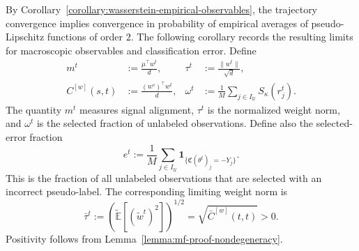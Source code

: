 By Corollary~\ref{corollary:wasserstein-empirical-observables},
the trajectory convergence implies convergence in probability
of empirical averages of pseudo-Lipschitz functions of order $2$.
The following corollary records the resulting limits for
macroscopic observables and classification error.
Define
\begin{align}
    m^t
    &:=
    \frac{\mu^\top w^t}{d},
    &
    \tau^t
    &:=
    \frac{\|w^t\|}{\sqrt d},
    \\
    C^{[w]}(s,t)
    &:=
    \frac{(w^s)^\top w^t}{d},
    &
    \omega^t
    &:=
    \frac1M\sum_{j\in I_{\mathcal U}}S_\kappa(r_j^t).
    \label{eq:finite-dimensional-trajectory-observables}
\end{align}
The quantity $m^t$ measures signal alignment, $\tau^t$ is the normalized
weight norm, and $\omega^t$ is the selected fraction of unlabeled
observations.
Define also the selected-error fraction
\[
    e^t
    :=
    \frac1M\sum_{j\in I_{\mathcal U}}
        \mathbf1_{\{\mathfrak C(\theta^t)_j=-Y_j\}}.
\]
This is the fraction of all unlabeled observations that
are selected with an incorrect pseudo-label.
The corresponding limiting weight norm is
\[
    \bar\tau^t
    :=
    \left(\tilde{\mathbb E}[(\tilde w^t)^2]\right)^{1/2}
    =
    \sqrt{\bar C^{[w]}(t,t)}
    >0.
\]
Positivity follows from
Lemma~\ref{lemma:mf-proof-nondegeneracy}.

